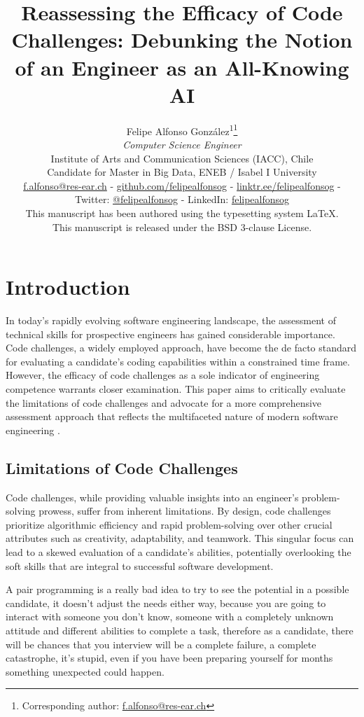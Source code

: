 \documentclass[
    a4paper, %
    10pt, %
    unnumberedsections, %
    twoside, %
]{LTJournalArticle}
\title{Reassessing the Efficacy of Code Challenges: Debunking the Notion of an Engineer as an All-Knowing AI}
\author{%
    Felipe Alfonso González\textsuperscript{1}\thanks{Corresponding author: \href{mailto:f.alfonso@res-ear.ch}{f.alfonso@res-ear.ch}}\\
    \textit{ Computer Science Engineer}\\
    \footnotesize Institute of Arts and Communication Sciences (IACC), Chile\\[-6pt]
    \footnotesize Candidate for Master in Big Data, ENEB / Isabel I University\\[-6pt]
    \footnotesize\href{mailto:f.alfonso@res-ear.ch}{f.alfonso@res-ear.ch} - 
    \footnotesize\href{https://github.com/felipealfonsog}{github.com/felipealfonsog} - 
    \href{https://linktr.ee/felipealfonsog}{linktr.ee/felipealfonsog} - 
    Twitter: \href{https://twitter.com/felipealfonsog}{@felipealfonsog} - 
    LinkedIn: \href{https://linkedin.com/in/felipealfonsog}{felipealfonsog}\\
    \scriptsize This manuscript has been authored using the typesetting system \LaTeX{}. \\[-6pt]
    \scriptsize This manuscript is released under the BSD 3-clause License. \\
}
\begin{document}
\maketitle %


\section{Introduction}

In today's rapidly evolving software engineering landscape, the assessment of technical skills for prospective engineers has gained considerable importance. Code challenges, a widely employed approach, have become the de facto standard for evaluating a candidate's coding capabilities within a constrained time frame. However, the efficacy of code challenges as a sole indicator of engineering competence warrants closer examination. This paper aims to critically evaluate the limitations of code challenges and advocate for a more comprehensive assessment approach that reflects the multifaceted nature of modern software engineering \cite{Smith2020,Johnson2019,Brown2021,Garcia2022}.

\subsection{Limitations of Code Challenges}

Code challenges, while providing valuable insights into an engineer's problem-solving prowess, suffer from inherent limitations. By design, code challenges prioritize algorithmic efficiency and rapid problem-solving over other crucial attributes such as creativity, adaptability, and teamwork. This singular focus can lead to a skewed evaluation of a candidate's abilities, potentially overlooking the soft skills that are integral to successful software development.




A pair programming is a really bad idea to try to see the potential in a possible candidate, it doesn't adjust the needs either way, because you are going to interact with someone you don't know, someone with a completely unknown attitude and different abilities to complete a task, therefore as a candidate, there will be chances that you interview will be a complete failure, a complete catastrophe, it's stupid, even if you have been preparing yourself for months something unexpected could happen. 
\end{document}
